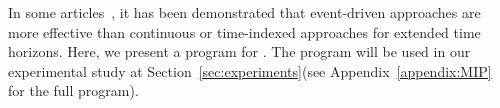 %
In some articles~\cite{2011_kone_COR}, it has been demonstrated that event-driven approaches are more effective than continuous or time-indexed approaches for extended time horizons. %
Here, we present a \MIP{} program for \UTP{}. 
The program will be used in our experimental study at Section~\ref{sec:experiments}(see Appendix~\ref{appendix:MIP} for the full program). 

